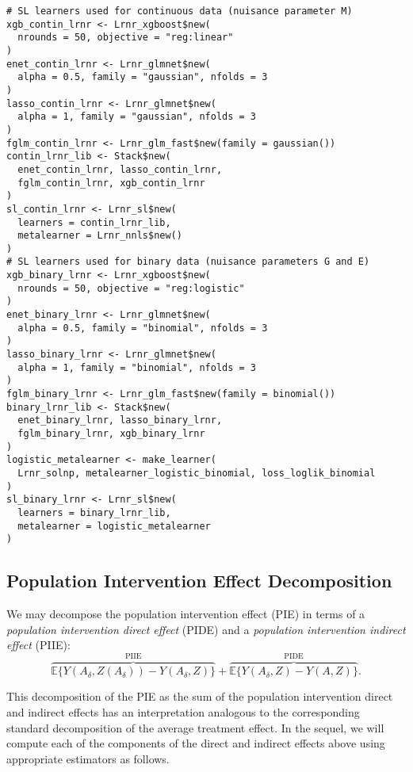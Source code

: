 \begin{lstlisting}
# SL learners used for continuous data (nuisance parameter M)
xgb_contin_lrnr <- Lrnr_xgboost$new(
  nrounds = 50, objective = "reg:linear"
)
enet_contin_lrnr <- Lrnr_glmnet$new(
  alpha = 0.5, family = "gaussian", nfolds = 3
)
lasso_contin_lrnr <- Lrnr_glmnet$new(
  alpha = 1, family = "gaussian", nfolds = 3
)
fglm_contin_lrnr <- Lrnr_glm_fast$new(family = gaussian())
contin_lrnr_lib <- Stack$new(
  enet_contin_lrnr, lasso_contin_lrnr,
  fglm_contin_lrnr, xgb_contin_lrnr
)
sl_contin_lrnr <- Lrnr_sl$new(
  learners = contin_lrnr_lib,
  metalearner = Lrnr_nnls$new()
)
# SL learners used for binary data (nuisance parameters G and E)
xgb_binary_lrnr <- Lrnr_xgboost$new(
  nrounds = 50, objective = "reg:logistic"
)
enet_binary_lrnr <- Lrnr_glmnet$new(
  alpha = 0.5, family = "binomial", nfolds = 3
)
lasso_binary_lrnr <- Lrnr_glmnet$new(
  alpha = 1, family = "binomial", nfolds = 3
)
fglm_binary_lrnr <- Lrnr_glm_fast$new(family = binomial())
binary_lrnr_lib <- Stack$new(
  enet_binary_lrnr, lasso_binary_lrnr,
  fglm_binary_lrnr, xgb_binary_lrnr
)
logistic_metalearner <- make_learner(
  Lrnr_solnp, metalearner_logistic_binomial, loss_loglik_binomial
)
sl_binary_lrnr <- Lrnr_sl$new(
  learners = binary_lrnr_lib,
  metalearner = logistic_metalearner
)
\end{lstlisting}

\subsection{Population Intervention Effect Decomposition}

We may decompose the population intervention effect (PIE) in terms of a
\textit{population intervention direct effect} (PIDE) and a \textit{population
intervention indirect effect} (PIIE):
\begin{equation*}
  \overbrace{\mathbb{E}\{Y(A_\delta, Z(A_\delta)) -
    Y(A_\delta, Z)\}}^{\text{PIIE}} +
    \overbrace{\mathbb{E}\{Y(A_\delta, Z) - Y(A, Z)\}}^{\text{PIDE}}.
\end{equation*}

This decomposition of the PIE as the sum of the population intervention direct
and indirect effects has an interpretation analogous to the corresponding
standard decomposition of the average treatment effect. In the sequel, we will
compute each of the components of the direct and indirect effects above using
appropriate estimators as follows.

